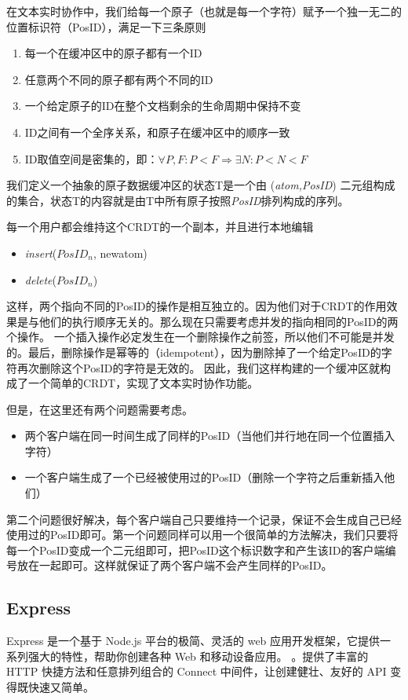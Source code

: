 \documentclass[11pt]{ctexart}
\begin{document}
在文本实时协作中，我们给每一个原子（也就是每一个字符）赋予一个独一无二的位置标识符（PosID），满足一下三条原则
\begin{enumerate}
	\item 每一个在缓冲区中的原子都有一个ID
	\item 任意两个不同的原子都有两个不同的ID
	\item 一个给定原子的ID在整个文档剩余的生命周期中保持不变
	\item ID之间有一个全序关系，和原子在缓冲区中的顺序一致
	\item ID取值空间是密集的，即：$\forall P, F : P < F \Rightarrow \exists N: P < N < F$
\end{enumerate}
我们定义一个抽象的原子数据缓冲区的状态T是一个由 (\textit{atom,PosID}) 二元组构成的集合，状态T的内容就是由T中所有原子按照\textit{PosID}排列构成的序列。 

每一个用户都会维持这个CRDT的一个副本，并且进行本地编辑
\begin{itemize}
	\item \textit{insert}($\mathit{PosID_{n}}$, newatom)
	\item \textit{delete}($\mathit{PosID_{n}}$)
\end{itemize}
这样，两个指向不同的PosID的操作是相互独立的。因为他们对于CRDT的作用效果是与他们的执行顺序无关的。那么现在只需要考虑并发的指向相同的PosID的两个操作。
一个插入操作必定发生在一个删除操作之前签，所以他们不可能是并发的。最后，删除操作是幂等的（idempotent），因为删除掉了一个给定PosID的字符再次删除这个PosID的字符是无效的。
因此，我们这样构建的一个缓冲区就构成了一个简单的CRDT，实现了文本实时协作功能。

但是，在这里还有两个问题需要考虑。
\begin{itemize}
	\item 两个客户端在同一时间生成了同样的PosID（当他们并行地在同一个位置插入字符）
	\item 一个客户端生成了一个已经被使用过的PosID（删除一个字符之后重新插入他们）
\end{itemize}

第二个问题很好解决，每个客户端自己只要维持一个记录，保证不会生成自己已经使用过的PosID即可。第一个问题同样可以用一个很简单的方法解决，我们只要将每一个PosID变成一个二元组即可，把PosID这个标识数字和产生该ID的客户端编号放在一起即可。这样就保证了两个客户端不会产生同样的PosID。

\subsection{Express}
Express 是一个基于 Node.js 平台的极简、灵活的 web 应用开发框架，它提供一系列强大的特性，帮助你创建各种 Web 和移动设备应用。
。提供了丰富的 HTTP 快捷方法和任意排列组合的 Connect 中间件，让创建健壮、友好的 API 变得既快速又简单。
\end{document}
